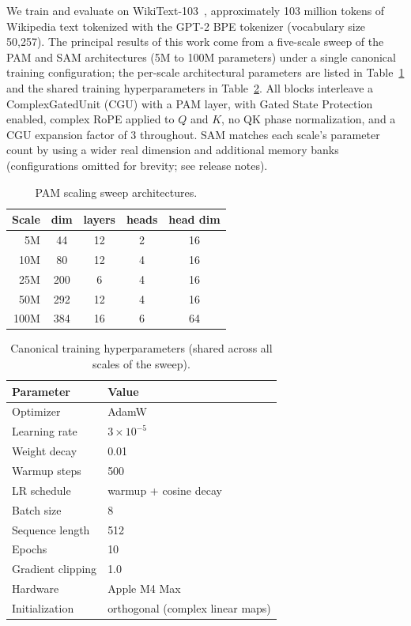\documentclass[aps,prl,twocolumn,superscriptaddress,amsmath,amssymb]{revtex4-2}
\begin{document}
We train and evaluate on WikiText-103~\cite{merity2017pointer}, approximately 103 million tokens of Wikipedia text tokenized with the GPT-2 BPE tokenizer (vocabulary size 50,257). The principal results of this work come from a five-scale sweep of the PAM and SAM architectures (5M to 100M parameters) under a single canonical training configuration; the per-scale architectural parameters are listed in Table~\ref{tab:config} and the shared training hyperparameters in Table~\ref{tab:train}. All blocks interleave a ComplexGatedUnit (CGU) with a PAM layer, with Gated State Protection enabled, complex RoPE applied to $Q$ and $K$, no QK phase normalization, and a CGU expansion factor of 3 throughout. SAM matches each scale's parameter count by using a wider real dimension and additional memory banks (configurations omitted for brevity; see release notes).

\begin{table}[t]
  \centering
  \caption{PAM scaling sweep architectures.}
  \label{tab:config}
  \begin{tabular}{@{}rcccc@{}}
    \toprule
    Scale & dim & layers & heads & head dim \\
    \midrule
    5M   &  44 & 12 & 2 & 16 \\
    10M  &  80 & 12 & 4 & 16 \\
    25M  & 200 &  6 & 4 & 16 \\
    50M  & 292 & 12 & 4 & 16 \\
    100M & 384 & 16 & 6 & 64 \\
    \bottomrule
  \end{tabular}
\end{table}

\begin{table}[t]
  \centering
  \caption{Canonical training hyperparameters (shared across all scales of the sweep).}
  \label{tab:train}
  \begin{tabular}{@{}ll@{}}
    \toprule
    Parameter & Value \\
    \midrule
    Optimizer & AdamW \\
    Learning rate & $3 \times 10^{-5}$ \\
    Weight decay & 0.01 \\
    Warmup steps & 500 \\
    LR schedule & warmup + cosine decay \\
    Batch size & 8 \\
    Sequence length & 512 \\
    Epochs & 10 \\
    Gradient clipping & 1.0 \\
    Hardware & Apple M4 Max \\
    Initialization & orthogonal (complex linear maps) \\
    \bottomrule
  \end{tabular}
\end{table}
\end{document}
